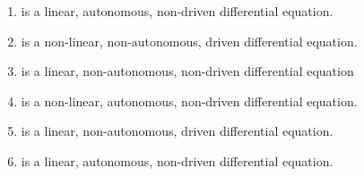 \documentclass[12 pt, letterpaper]{hmcpset}
\begin{document}
\begin{solution}
	\begin{enumerate}
		\item is a linear, autonomous, non-driven differential equation.
		\item is a non-linear, non-autonomous, driven differential equation.
		\item is a linear,  non-autonomous, non-driven differential equation
		\item is a non-linear, autonomous, non-driven differential equation.
		\item is a linear, non-autonomous, driven differential equation.
		\item is a linear, autonomous, non-driven differential equation.
	\end{enumerate}
\end{solution}
\end{document}
